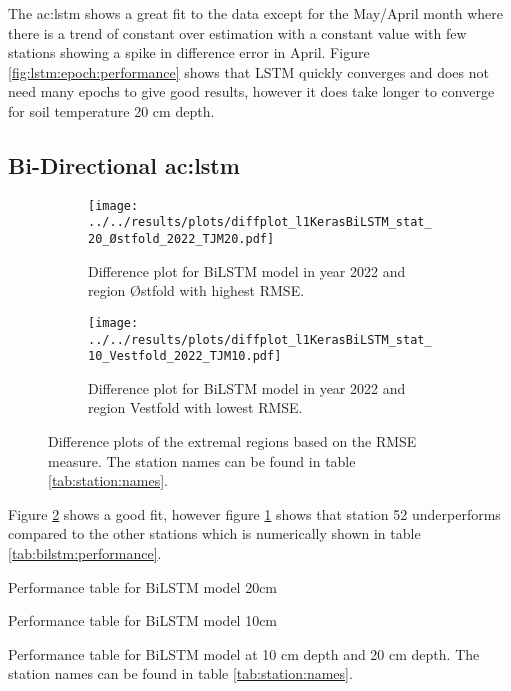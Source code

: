 The \acrshort{ac:lstm} shows a great fit to the data except for the May/April month where there is a trend of constant over estimation with a constant value with few stations showing a spike in difference error in April. Figure \ref{fig:lstm:epoch:performance} shows that LSTM quickly converges and does not need many epochs to give good results, however it does take longer to converge for soil temperature 20 cm depth.

\subsection{Bi-Directional \acrfull{ac:lstm}}

\begin{figure}
	\begin{subfigure}{0.45\textwidth}
		\centering
		\texttt{[image: ../../results/plots/diffplot\_l1KerasBiLSTM\_stat\_20\_Østfold\_2022\_TJM20.pdf]}
		\caption[Difference plot of BiLSTM model with highest RMSE]{Difference plot for BiLSTM model in year 2022 and region Østfold with highest RMSE.}
		\label{fig:bilstm:diff:worst}
	\end{subfigure}
	\hfill
	\begin{subfigure}{0.45\textwidth}
		\centering
		\texttt{[image: ../../results/plots/diffplot\_l1KerasBiLSTM\_stat\_10\_Vestfold\_2022\_TJM10.pdf]}
		\caption[Difference plot of BiLSTM model lowest RMSE]{Difference plot for BiLSTM model in year 2022 and region Vestfold with lowest RMSE.}
	\end{subfigure}
		\caption[Difference plots of extremal regions BiLSTM]{Difference plots of the extremal regions based on the RMSE measure. The station names can be found in table \ref{tab:station:names}.}
		\label{fig:bilstm:diff:bestworst}
\end{figure}

Figure \ref{fig:bilstm:diff:bestworst} shows a good fit, however figure \ref{fig:bilstm:diff:worst} shows that station 52 underperforms compared to the other stations which is numerically shown in table \ref{tab:bilstm:performance}. 

\begin{table}
	\begin{subtable}{0.8\textwidth}
		
		\caption{Performance table for BiLSTM model 20cm}
	\end{subtable}
	\begin{subtable}{0.8\textwidth}
		
		\caption{Performance table for BiLSTM model 10cm}
	\end{subtable}
	\caption{Performance table for BiLSTM model at 10 cm depth and 20 cm depth. The station names can be found in table \ref{tab:station:names}.}
	\label{tab:bilstm:performance}
\end{table}

